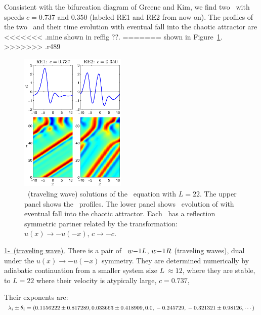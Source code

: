 Consistent with the bifurcation diagram of Greene and Kim,
we find two \reqva\ with speeds $c = 0.737$ and $0.350$
(labeled RE1 and RE2 from now on).
The profiles of the two \reqva\ and their time evolution
with eventual fall into the chaotic attractor are
<<<<<<< .mine
shown in reffig ??. %
=======
shown in Figure~\ref{f:ks22RE}.
>>>>>>> .r489

\begin{figure}[h]\vspace*{-5pt} \centering
\includegraphics[width=0.45\textwidth]{figs/ks22_RE1-2.eps}
\vspace*{-5pt}\caption{ {\small \Reqv\ (traveling wave)
solutions of the \KS\ equation with $L = 22.$ The upper panel shows
the \Reqva\ profiles. The lower panel shows \Reqva\ evolution
of \reqva with eventual fall into the chaotic attractor.
Each \reqv\ has a reflection symmetric partner related by the
transformation: $u(x) \to -u(-x)$, $c \to -c$.}}
\label{f:ks22RE}\vspace*{-5pt}
\end{figure}


\underline{1-\reqv\  (traveling wave).}
There is a pair of \reqva\
${w-}1L$,
${w-}1R$
(traveling waves), dual under the
$u(x) \to -u(-x)$ symmetry. They are
determined numerically by
adiabatic continuation from a smaller system size
$L~\approx 12$,
where they are stable, to $L=22$
where their velocity is atypically large, $c=0.737$,

Their exponents are:
\\
$\lambda_i \pm \theta_i =
(
\\
  0.1156222 \pm 0.817289,   \\
  0.033663 \pm 0.418909,    \\
 0.0                    ,   \\
 -0.245729                    , \\
 -0.321321 \pm 0.98126,
\cdots
)$

